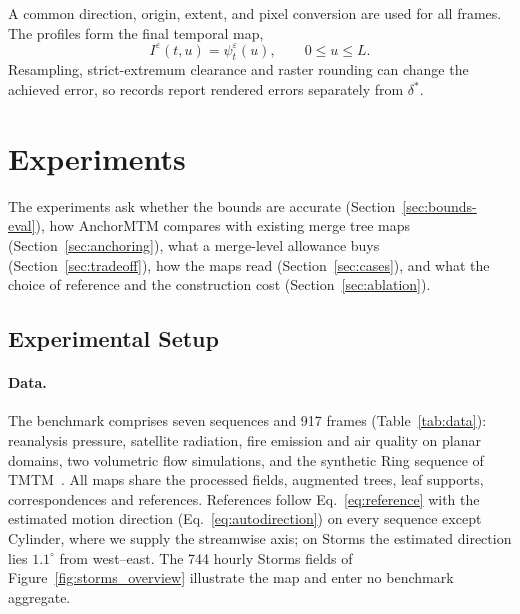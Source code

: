\documentclass[review]{vgtc}
\begin{document}
A common direction, origin, extent, and pixel conversion are used for all frames. The profiles form the final temporal map,
\begin{equation}\label{eq:map}
 I^\varepsilon(t,u)=\psi_t^\varepsilon(u),\qquad 0\le u\le L.
\end{equation}
Resampling, strict-extremum clearance and raster rounding can change the achieved error, so records report rendered errors separately from $\delta^*$.

\section{Experiments}\label{sec:experiments}
The experiments ask whether the bounds are accurate (Section~\ref{sec:bounds-eval}), how AnchorMTM compares with existing merge tree maps (Section~\ref{sec:anchoring}), what a merge-level allowance buys (Section~\ref{sec:tradeoff}), how the maps read (Section~\ref{sec:cases}), and what the choice of reference and the construction cost (Section~\ref{sec:ablation}).

\subsection{Experimental Setup}\label{sec:setup}
\paragraph{Data.} The benchmark comprises seven sequences and 917 frames (Table~\ref{tab:data}): reanalysis pressure, satellite radiation, fire emission and air quality on planar domains, two volumetric flow simulations, and the synthetic Ring sequence of TMTM~\cite{Hersbach:2020:ERA5,Franke:2021:1DP,NOAA:OLR,Dong:2026:PM25,Koepp:2023:TMTM,Popinet:2004:Tangaroa,Camarri:2005:Cylinder,Weinkauf:SquareCylinder}. All maps share the processed fields, augmented trees, leaf supports, correspondences and references. References follow Eq.~\ref{eq:reference} with the estimated motion direction (Eq.~\ref{eq:autodirection}) on every sequence except Cylinder, where we supply the streamwise axis; on Storms the estimated direction lies $1.1^\circ$ from west--east. The 744 hourly Storms fields of Figure~\ref{fig:storms_overview} illustrate the map and enter no benchmark aggregate.
\end{document}
